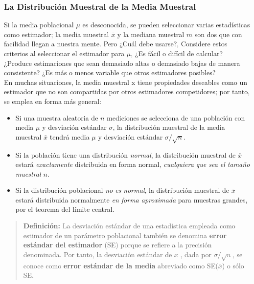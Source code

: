 \documentclass[]{article}
\begin{document}
\subsubsection*{La Distribución Muestral de la Media Muestral}
Si la media poblacional $\mu$ es desconocida, se pueden seleccionar varias estadísticas como estimador; la media muestral $\overline{x}$ y la mediana muestral $m$ son dos que con facilidad llegan a nuestra mente. Pero ¿Cuál debe usarse?, Considere estos criterios al seleccionar el estimador para $\mu$, ¿Es fácil o difícil de calcular? ¿Produce estimaciones que sean demasiado altas o demasiado bajas de manera consistente? ¿Es más o menos variable que otros estimadores posibles?
\\ En muchas situaciones, la media muestral x  tiene propiedades deseables como un estimador que no son compartidas por otros estimadores competidores; por tanto, se emplea en forma más general:
\begin{itemize}
	\item Si una muestra aleatoria de $n$ mediciones se selecciona de una población con media $\mu$ y desviación estándar $\sigma$, la distribución muestral de la media muestral $\overline{x}$ tendrá media $\mu$ y desviación estándar $\sigma/\sqrt{n}$.
	\item Si la población tiene una distribución \textit{normal}, la distribución muestral de $\overline{x}$ estará \textit{exactamente} distribuida en forma normal, \textit{cualquiera que sea el tamaño muestral $n$}.
	\item Si la distribución poblacional \textit{no es normal}, la distribución muestral de $\overline{x}$  estará distribuida normalmente \textit{en forma aproximada} para muestras grandes, por el teorema del límite central.
\end{itemize}
\begin{quote}
	\textbf{Definición:} La desviación estándar de una estadística empleada como estimador de un parámetro poblacional también se denomina \textbf{error estándar del estimador} (SE) porque se refiere a la precisión denominada. Por tanto, la desviación estándar de $\overline{x}$ , dada por $\sigma/\sqrt{n}$, se conoce como \textbf{error estándar de la media} abreviado como SE($\overline{x}$) o sólo SE.
\end{quote}
\end{document}
